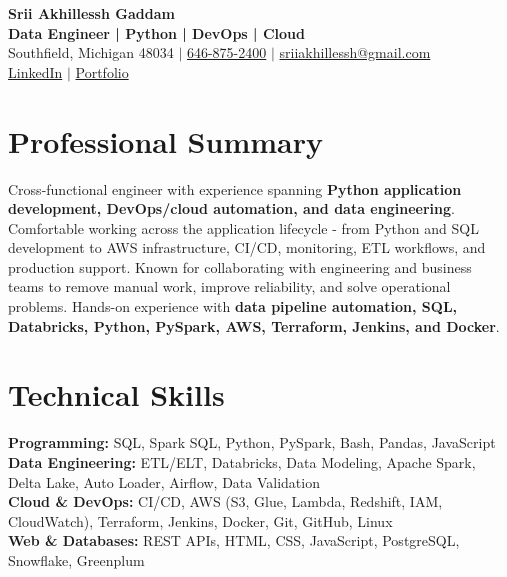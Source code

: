 \documentclass[letterpaper,10pt]{article}
\begin{document}
\fontsize{9.35pt}{10.45pt}\selectfont

\begin{center}
    {\LARGE \textbf{Srii Akhillessh Gaddam}} \\[-1pt]
    \textbf{Data Engineer | Python | DevOps | Cloud} \\[2pt]
    Southfield, Michigan 48034 $|$
    \href{tel:6468752400}{646-875-2400} $|$
    \href{mailto:sriiakhillessh@gmail.com}{sriiakhillessh@gmail.com} \\[1pt]
    \href{https://www.linkedin.com/in/srii-akhiilessh-gaddam-b48668191/}{LinkedIn} $|$
    \href{https://sriiakhillesshg.github.io/portfolio/}{Portfolio}
\end{center}
\vspace{-8pt}

\section{Professional Summary}
\small{Cross-functional engineer with experience spanning \textbf{Python application development, DevOps/cloud automation, and data engineering}. Comfortable working across the application lifecycle - from Python and SQL development to AWS infrastructure, CI/CD, monitoring, ETL workflows, and production support. Known for collaborating with engineering and business teams to remove manual work, improve reliability, and solve operational problems. Hands-on experience with \textbf{data pipeline automation, SQL, Databricks, Python, PySpark, AWS, Terraform, Jenkins, and Docker}.}

\section{Technical Skills}
\small{
\textbf{Programming:} SQL, Spark SQL, Python, PySpark, Bash, Pandas, JavaScript \\
\textbf{Data Engineering:} ETL/ELT, Databricks, Data Modeling, Apache Spark, Delta Lake, Auto Loader, Airflow, Data Validation \\
\textbf{Cloud \& DevOps:} CI/CD, AWS (S3, Glue, Lambda, Redshift, IAM, CloudWatch), Terraform, Jenkins, Docker, Git, GitHub, Linux \\
\textbf{Web \& Databases:} REST APIs, HTML, CSS, JavaScript, PostgreSQL, Snowflake, Greenplum
}

\end{document}
